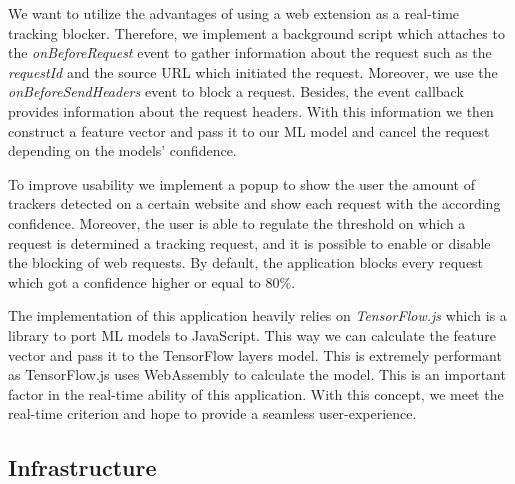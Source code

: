We want to utilize the advantages of using a web extension as a real-time tracking blocker. Therefore, we implement a background script
which attaches to the \emph{onBeforeRequest} event to gather information about the request such as the \emph{requestId} and the source URL 
which initiated the request. Moreover, we use the \emph{onBeforeSendHeaders} event to block a request. Besides, the event callback provides
information about the request headers. With this information we then construct a feature vector and pass it to our ML model and cancel the 
request depending on the models' confidence. 

To improve usability we implement a popup to show the user the amount of trackers detected on a certain website and show
each request with the according confidence. Moreover, the user is able to regulate the threshold on which a request is determined a 
tracking request, and it is possible to enable or disable the blocking of web requests. By default, the application blocks every request
which got a confidence higher or equal to 80\%.

The implementation of this application heavily relies on \emph{TensorFlow.js} \cite{tensorflowJs} which is a library to port ML models to
JavaScript. This way we can calculate the feature vector and pass it to the TensorFlow layers model. This is extremely
performant as TensorFlow.js uses WebAssembly to calculate the model. This is an important factor in the real-time ability of this application.
With this concept, we meet the real-time criterion and hope to provide a seamless user-experience.

\subsection{Infrastructure}

